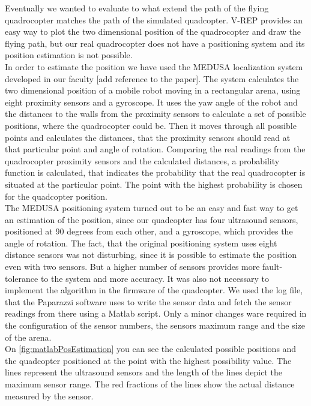Eventually we wanted to evaluate to what extend the path of the flying quadrocopter matches the path of the simulated quadcopter. V-REP provides an easy way to plot the two dimensional position of the quadrocopter and draw the flying path, but our real quadrocopter does not have a positioning system and its position estimation is not possible.\\ In order to estimate the position we have used the MEDUSA localization system developed in our faculty [add reference to the paper]. The system calculates the two dimensional position of a mobile robot moving in a rectangular arena, using eight proximity sensors and a gyroscope. It uses the yaw angle of the robot and the distances to the walls from the proximity sensors to calculate a set of possible positions, where the quadrocopter could be. Then it moves through all possible points and calculates the distances, that the proximity sensors should read at that particular point and angle of rotation. Comparing the real readings from the quadrocopter proximity sensors and the calculated distances, a probability function is calculated, that indicates the probability that the real quadrocopter is situated at the particular point. The point with the highest probability is chosen for the quadcopter position.\\
The MEDUSA positioning system turned out to be an easy and fast way to get an estimation of the position, since our quadcopter has four ultrasound sensors, positioned at 90 degrees from each other, and a gyroscope, which provides the angle of rotation. The fact, that the original positioning system uses eight distance sensors was not disturbing, since it is possible to estimate the position even with two sensors. But a higher number of sensors provides more fault-tolerance to the system and more accuracy. It was also not necessary to implement the algorithm in the firmware of the quadcopter. We used the log file, that the Paparazzi software uses to write the sensor data and fetch the sensor readings from there using a Matlab script. Only a minor changes ware required in the configuration of the sensor numbers, the sensors maximum range and the size of the arena.\\
On \ref{fig:matlabPosEstimation} you can see the calculated possible positions and the quadcopter positioned at the point with the highest possibility value. The lines represent the ultrasound sensors and the length of the lines depict the maximum sensor range. The red fractions of the lines show the actual distance measured by the sensor. 

